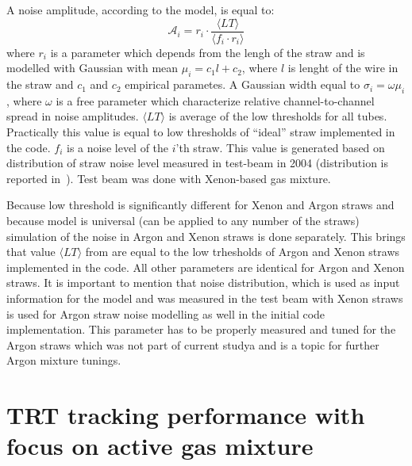 
A noise amplitude, according to the model, is equal to:
\begin{equation}
 \mathcal A_{i} = r_{i} \cdot \dfrac{\langle LT \rangle}{\langle f_i \cdot r_i \rangle}
 \label{eq:ampl_noise}
\end{equation}
where $r_{i}$ is a parameter which depends from the lengh of the straw and is modelled with Gaussian with mean $\mu_i = c_1 l + c_2$, 
where $l$ is lenght of the wire in the straw and $c_1$ and $c_2$ empirical parametes. 
A Gaussian width equal to $\sigma_i = \omega \mu_i$, where $\omega$ is a free parameter which characterize
relative channel-to-channel spread in noise amplitudes.
$\langle LT \rangle$ is average of the low thresholds for all tubes. Practically this value is equal to low thresholds of ``ideal'' straw 
implemented in the code.
$f_{i}$ is a noise level of the $i$'th straw. This value is generated based on distribution of straw noise level measured in test-beam in 2004 
(distribution is reported in~\cite{kittelmann_thesis}). Test beam was done with Xenon-based gas mixture. 

Because low threshold is significantly different for Xenon and Argon straws and because model is universal (can be applied to any number of the straws) 
simulation of the noise in Argon and Xenon straws is done separately. This brings that value $\langle LT \rangle$ from  are 
equal to the low trhesholds of Argon and Xenon straws implemented in the code. All other parameters are identical for Argon and Xenon straws.
It is important to mention that noise distribution, which is used as input information for the model and was measured in the test beam with Xenon straws
is used for Argon straw noise modelling as well in the initial code implementation. This parameter has to be properly measured and tuned for the Argon straws which
was not part of current studya and is a topic for further Argon mixture tunings.

\section{TRT tracking performance with focus on active gas mixture}
\label{sec:digi_argon}

